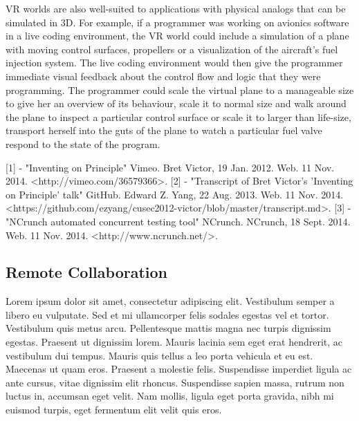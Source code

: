 \documentclass{acm_proc_article-sp}
\begin{document}
VR worlds are also well-suited to applications with physical analogs that can be simulated in 3D. For example, if a programmer was working on avionics software in a live coding environment, the VR world could include a simulation of a plane with moving control surfaces, propellers or a visualization of the aircraft's fuel injection system. The live coding environment would then give the programmer immediate visual feedback about the control flow and logic that they were programming. The programmer could scale the virtual plane to a manageable size to give her an overview of its behaviour, scale it to normal size and walk around the plane to inspect a particular control surface or scale it to larger than life-size, transport herself into the guts of the plane to watch a particular fuel valve respond to the state of the program.

[1] - "Inventing on Principle" Vimeo. Bret Victor, 19 Jan. 2012. Web. 11 Nov. 2014. <http://vimeo.com/36579366>.
[2] - "Transcript of Bret Victor's 'Inventing on Principle' talk" GitHub. Edward Z. Yang, 22 Aug. 2013. Web. 11 Nov. 2014. <https://github.com/ezyang/cusec2012-victor/blob/master/transcript.md>.
[3] - "NCrunch automated concurrent testing tool" NCrunch. NCrunch, 18 Sept. 2014. Web. 11 Nov. 2014. <http://www.ncrunch.net/>.

\subsection{Remote Collaboration}


Lorem ipsum dolor sit amet, consectetur adipiscing elit. Vestibulum semper a libero eu vulputate. Sed et mi ullamcorper felis sodales egestas vel et tortor. Vestibulum quis metus arcu. Pellentesque mattis magna nec turpis dignissim egestas. Praesent ut dignissim lorem. Mauris lacinia sem eget erat hendrerit, ac vestibulum dui tempus. Mauris quis tellus a leo porta vehicula et eu est. Maecenas ut quam eros. Praesent a molestie felis. Suspendisse imperdiet ligula ac ante cursus, vitae dignissim elit rhoncus. Suspendisse sapien massa, rutrum non luctus in, accumsan eget velit. Nam mollis, ligula eget porta gravida, nibh mi euismod turpis, eget fermentum elit velit quis eros.
\end{document}
